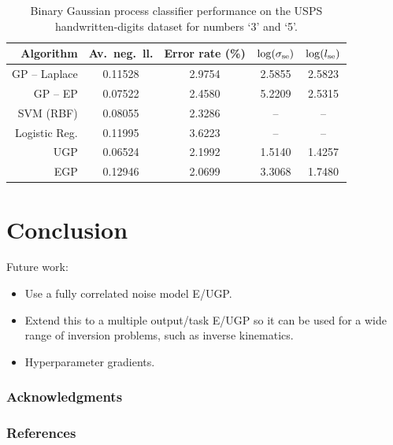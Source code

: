 \documentclass{article} %
\begin{document}
\begin{table}[htb]
    \centering
    \small
    \caption[]{Binary Gaussian process classifier performance on the USPS
        handwritten-digits dataset for numbers `3' and `5'.}
    \begin{tabular}{r| c c c c}
        Algorithm & Av.\ neg.\ ll. & Error rate (\%) 
            & $\log\!\left({\sigma_\text{se}}\right)$ & $\log\!\left({l_\text{se}}\right)$ \\
        \toprule
        GP -- Laplace & 0.11528 & 2.9754 & 2.5855 & 2.5823 \\
        GP -- EP & 0.07522 & 2.4580 & 5.2209 & 2.5315 \\
        SVM (RBF) & 0.08055 & 2.3286 & -- & -- \\
        Logistic Reg. & 0.11995 & 3.6223 & -- & -- \\
        \midrule
        UGP & 0.06524 & 2.1992 & 1.5140 & 1.4257 \\
        EGP & 0.12946 & 2.0699 & 3.3068 & 1.7480 \\
        \bottomrule
    \end{tabular}
\end{table}

\section{Conclusion}

Future work:
\begin{itemize}
    \item Use a fully correlated noise model E/UGP.
    \item Extend this to a multiple output/task E/UGP so it can be used for a
        wide range of inversion problems, such as inverse kinematics.
    \item Hyperparameter gradients.
\end{itemize}

\subsubsection*{Acknowledgments}

\subsubsection*{References}
\printbibliography
\end{document}
